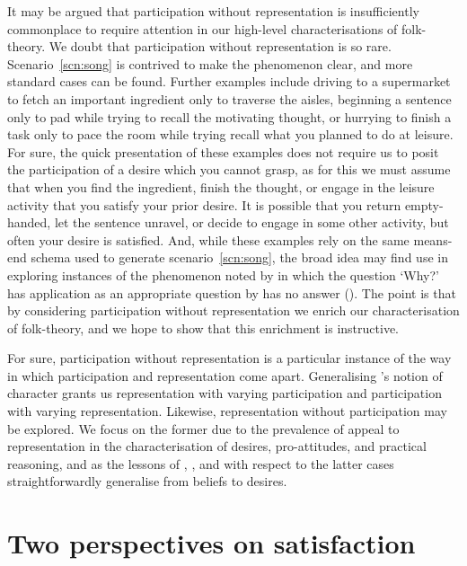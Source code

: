 \documentclass[10pt]{article}
\begin{document}
It may be argued that participation without representation is insufficiently commonplace to require attention in our high-level characterisations of folk-theory.
We doubt that participation without representation is so rare.
Scenario~\ref{scn:song} is contrived to make the phenomenon clear, and more standard cases can be found.
Further examples include driving to a supermarket to fetch an important ingredient only to traverse the aisles, beginning a sentence only to pad while trying to recall the motivating thought, or hurrying to finish a task only to pace the room while trying recall what you planned to do at leisure.
For sure, the quick presentation of these examples does not require us to posit the participation of a desire which you cannot grasp, as for this we must assume that when you find the ingredient, finish the thought, or engage in the leisure activity that you satisfy your prior desire.
It is possible that you return empty-handed, let the sentence unravel, or decide to engage in some other activity, but often your desire is satisfied.
And, while these examples rely on the same means-end schema used to generate scenario~\ref{scn:song}, the broad idea may find use in exploring instances of the phenomenon noted by \citeauthor{Anscombe:1957aa} in which the question `Why?' has application as an appropriate question by has no answer (\citeyear[--18]{Anscombe:1957aa}).
The point is that by considering participation without representation we enrich our characterisation of folk-theory, and we hope to show that this enrichment is instructive.

For sure, participation without representation is a particular instance of the way in which participation and representation come apart.
Generalising \citeauthor{Kaplan:1989aa}'s notion of character grants us representation with varying participation and participation with varying representation.
Likewise, representation without participation may be explored.
We focus on the former due to the prevalence of appeal to representation in the characterisation of desires, pro-attitudes, and practical reasoning, and as the lessons of \citeauthor{Kaplan:1989ab}, \citeauthor{Lewis:1979aa}, and \citeauthor{Perry:1993aa} with respect to the latter cases straightforwardly generalise from beliefs to desires.

\section{Two perspectives on satisfaction}
\label{sec:two-persp-satisf}
\end{document}
